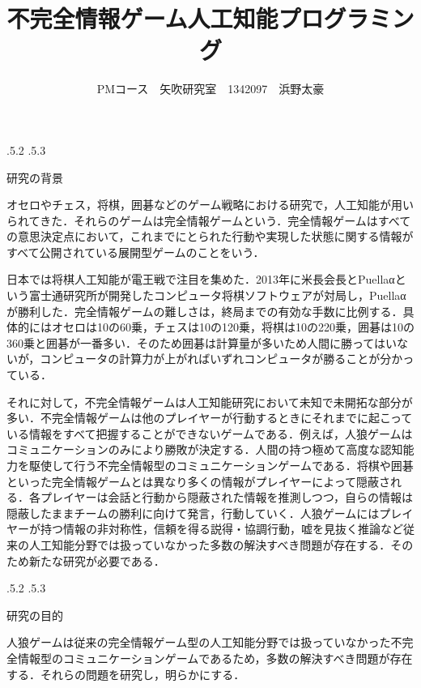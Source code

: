 \documentclass[uplatex]{jsarticle}
\title{\vspace{-14mm}不完全情報ゲーム人工知能プログラミング}
\author{PMコース　矢吹研究室　1342097　浜野太豪}
\date{}%
\makeatletter
\renewcommand{\section}{%
    \if@slide\clearpage\fi
    \@startsection{section}{1}{\z@}%
    {\Cvs \@plus.5\Cdp \@minus.2\Cdp}%
    {.5\Cvs \@plus.3\Cdp}%
    {\normalfont\raggedright}}
\makeatother
\begin{document}
\maketitle





\section{研究の背景}

オセロやチェス，将棋，囲碁などのゲーム戦略における研究で，人工知能が用いられてきた．それらのゲームは完全情報ゲームという．完全情報ゲームはすべての意思決定点において，これまでにとられた行動や実現した状態に関する情報がすべて公開されている展開型ゲームのことをいう．\cite{okumura2013}

日本では将棋人工知能が電王戦で注目を集めた．2013年に米長会長とPuellaαという富士通研究所が開発したコンピュータ将棋ソフトウェアが対局し，Puellaαが勝利した．完全情報ゲームの難しさは，終局までの有効な手数に比例する．具体的にはオセロは10の60乗，チェスは10の120乗，将棋は10の220乗，囲碁は10の360乗と囲碁が一番多い．\cite{jinro2}そのため囲碁は計算量が多いため人間に勝ってはいないが，コンピュータの計算力が上がればいずれコンピュータが勝ることが分かっている．

それに対して，不完全情報ゲームは人工知能研究において未知で未開拓な部分が多い．不完全情報ゲームは他のプレイヤーが行動するときにそれまでに起こっている情報をすべて把握することができないゲームである．\cite{wiki2}例えば，人狼ゲームはコミュニケーションのみにより勝敗が決定する．人間の持つ極めて高度な認知能力を駆使して行う不完全情報型のコミュニケーションゲームである．将棋や囲碁といった完全情報ゲームとは異なり多くの情報がプレイヤーによって隠蔽される．各プレイヤーは会話と行動から隠蔽された情報を推測しつつ，自らの情報は隠蔽したままチームの勝利に向けて発言，行動していく．人狼ゲームにはプレイヤーが持つ情報の非対称性，信頼を得る説得・協調行動，嘘を見抜く推論など従来の人工知能分野では扱っていなかった多数の解決すべき問題が存在する．\cite{jinro1}そのため新たな研究が必要である．


\section{研究の目的}

人狼ゲームは従来の完全情報ゲーム型の人工知能分野では扱っていなかった不完全情報型のコミュニケーションゲームであるため，多数の解決すべき問題が存在する．それらの問題を研究し，明らかにする．
\end{document}
